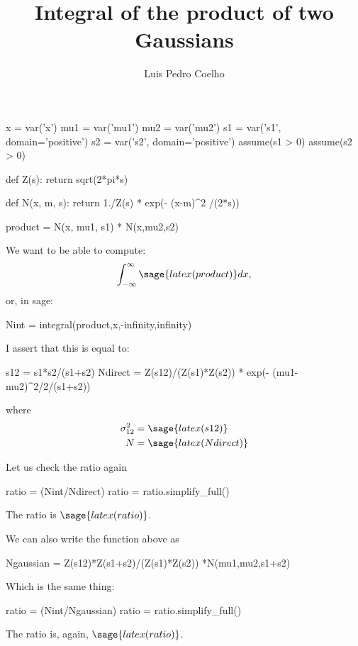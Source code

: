 \documentclass{article}
\begin{document}
\title{Integral of the product of two Gaussians}
\author{Luis Pedro Coelho}
\maketitle

\begin{sageblock}
x = var('x')
mu1 = var('mu1')
mu2 = var('mu2')
s1 = var('s1', domain='positive')
s2 = var('s2', domain='positive')
assume(s1 > 0)
assume(s2 > 0)

def Z(s):
    return sqrt(2*pi*s)

def N(x, m, s):
    return 1./Z(s) * exp(- (x-m)^2 /(2*s))
\end{sageblock}

\begin{sageblock}
product = N(x, mu1, s1) * N(x,mu2,s2)
\end{sageblock}

We want to be able to compute:
\begin{equation}
\int_{-\infty}^{\infty} \sage{latex(product)} dx,
\end{equation}
or, in sage:
\begin{sageblock}
Nint = integral(product,x,-infinity,infinity)
\end{sageblock}

I assert that this is equal to:
\begin{sageblock}
s12 = s1*s2/(s1+s2)
Ndirect = Z(s12)/(Z(s1)*Z(s2)) * exp(- (mu1-mu2)^2/2/(s1+s2))
\end{sageblock}
where
\begin{align}
\sigma^2_{12} &= \sage{latex(s12)}\\
N &= \sage{latex(Ndirect)}
\end{align}

Let us check the ratio again
\begin{sageblock}
ratio = (Nint/Ndirect)
ratio = ratio.simplify_full()
\end{sageblock}
The ratio is $\sage{latex(ratio)}$.

We can also write the function above as
\begin{sageblock}
Ngaussian = Z(s12)*Z(s1+s2)/(Z(s1)*Z(s2)) *N(mu1,mu2,s1+s2)
\end{sageblock}
Which is the same thing:
\begin{sageblock}
ratio = (Nint/Ngaussian)
ratio = ratio.simplify_full()
\end{sageblock}
The ratio is, again, $\sage{latex(ratio)}$.
\end{document}
